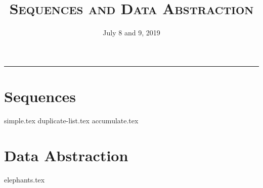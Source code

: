 \documentclass{exam}
\title{\textsc{Sequences and Data Abstraction}}
\date{July 8 and 9, 2019}
\begin{document}
\maketitle
\rule{\textwidth}{0.15em}
\fontsize{12}{15}\selectfont


\section{Sequences}
\begin{questions}
{simple.tex}
{duplicate-list.tex}
\newpage
{accumulate.tex}
\end{questions}


\newpage
\section{Data Abstraction}
\begin{questions}
{elephants.tex}
\end{questions}
\end{document}

